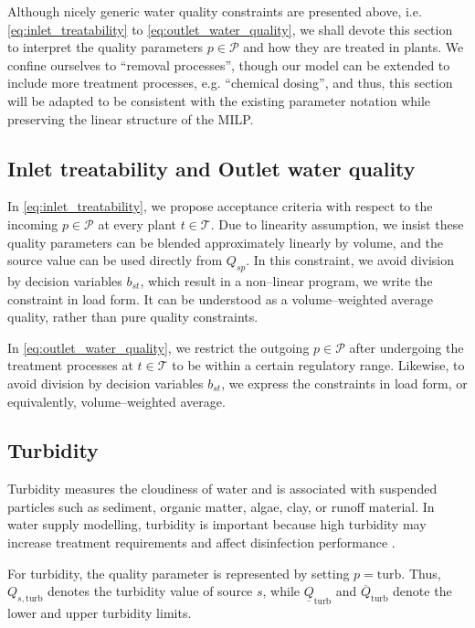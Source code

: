 Although nicely generic water quality constraints are presented above, i.e. \eqref{eq:inlet_treatability} to \eqref{eq:outlet_water_quality},
we shall devote this section to interpret the quality parameters $p \in \mathcal P$ and how they are treated in plants.
We confine ourselves to ``removal processes'', though our model can be extended to include more treatment processes, e.g. ``chemical dosing'', and thus, this section will be adapted to be consistent with the existing parameter notation while preserving the linear structure of the MILP.

\subsection{Inlet treatability and Outlet water quality}

In \eqref{eq:inlet_treatability}, we propose acceptance criteria with respect to the incoming $p \in \mathcal P$ at every plant $t \in \mathcal T$.
Due to linearity assumption, we insist these quality parameters can be blended approximately linearly by volume, and the source value can be used directly from $Q_{sp}$.
In this constraint, we avoid division by decision variables $b_{st}$, which result in a non–linear program, we write the constraint in load form.
It can be understood as a volume–weighted average quality, rather than pure quality constraints.

In \eqref{eq:outlet_water_quality}, we restrict the outgoing $p \in \mathcal P$ after undergoing the treatment processes at $t \in \mathcal T$ to be within a certain regulatory range.
Likewise, to avoid division by decision variables $b_{st}$, we express the constraints in load form, or equivalently, volume–weighted average.

\subsection{Turbidity}

Turbidity measures the cloudiness of water and is associated with suspended particles such as sediment, organic matter, algae, clay, or runoff material.
In water supply modelling, turbidity is important because high turbidity may increase treatment requirements and affect disinfection performance \cite{WHOTurbidity2011, Matos2024Turbidity, UMNTurbidity}.

For turbidity, the quality parameter is represented by setting $p=\mathrm{turb}$.
Thus, $Q_{s,\mathrm{turb}}$ denotes the turbidity value of source $s$, while $\underline{Q}_{\mathrm{turb}}$ and $\overline{Q}_{\mathrm{turb}}$ denote the lower and upper turbidity limits.

